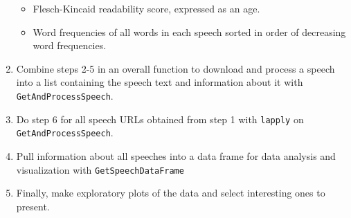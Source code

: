 \documentclass{article}\usepackage[]{graphicx}\usepackage[]{color}
\begin{document}
\begin{enumerate}
\begin{itemize}
  \item Flesch-Kincaid readability score, expressed as an age.
  \item Word frequencies of all words in each speech sorted in order of decreasing word frequencies.
  \end{itemize}
\item Combine steps 2-5 in an overall function to download and process a speech into a list containing the speech text and information about it with \texttt{GetAndProcessSpeech}.
\item Do step 6 for all speech URLs obtained from step 1 with \texttt{lapply} on \texttt{GetAndProcessSpeech}.
\item Pull information about all speeches into a data frame for data analysis and visualization 
with \texttt{GetSpeechDataFrame}
\item Finally, make exploratory plots of the data and select interesting ones to present.
\end{enumerate}
\end{document}
